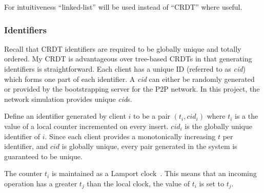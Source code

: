 \documentclass[12pt,a4paper,twoside,openright]{report}
\begin{document}
		
		For intuitiveness ``linked-list'' will be used instead of ``CRDT'' where useful.
	
		\subsubsection{Identifiers} 	\label{sec:crdt:identifiers}
				
		Recall that CRDT identifiers are required to be globally unique and totally ordered. My CRDT is advantageous over tree-based CRDTs in that generating identifiers is straightforward. Each client has a unique ID (referred to as \textit{cid}) which forms one part of each identifier. A \textit{cid} can either be randomly generated or provided by the bootstrapping server for the P2P network. In this project, the network simulation provides unique \textit{cid}s.
		
		Define an identifier generated by client $i$ to be a pair $(t_i, cid_i)$ where $t_i$ is a the value of a local counter incremented on every insert. $cid_i$ is the globally unique identifier of $i$. Since each client provides a monotonically increasing $t$ per identifier, and $cid$ is globally unique, every pair generated in the system is guaranteed to be unique.
		
		The counter $t_i$ is maintained as a Lamport clock~\cite{lamport1978}. This means that an incoming operation has a greater $t_j$ than the local clock, the value of $t_i$ is set to $t_j$. 
		
\end{document}
